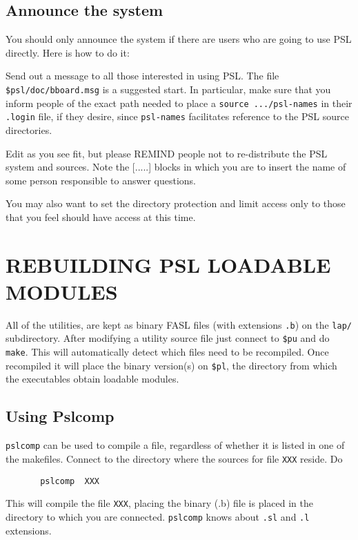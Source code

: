 \subsection{Announce the system}

You should only announce the system if there are users who are going
to use PSL directly. Here is how to do it:

Send out a message to all those interested in using PSL.  The file
{\tt \$psl/doc/bboard.msg} is a suggested start.  In particular, make
sure that you inform people of the exact path needed to place a
{\tt source .../psl-names} in their {\tt .login} file, if they desire, since
{\tt psl-names} facilitates reference to the PSL source directories.

Edit as you see fit, but please REMIND people not to re-distribute the PSL
system and sources. Note the [.....] blocks in which you are to insert
the name of some person responsible to answer questions.

You may also want to set the directory protection and limit access only to
those that you feel should have access at this time.

\section{REBUILDING PSL LOADABLE MODULES}

All of the utilities, are kept as binary FASL files (with extensions
{\tt .b}) on the {\tt lap/} subdirectory.  After modifying a utility source
file just connect to {\tt \$pu} and do {\tt make}.  This will
automatically detect which files need to be recompiled.  Once
recompiled it will place the binary version(s) on {\tt \$pl}, the
directory from which the executables obtain loadable modules.

\subsection{Using Pslcomp}

{\tt pslcomp} can be used to compile a file, regardless of whether it is
listed in one of the makefiles.  Connect to the directory where the
sources for file {\tt XXX} reside.  Do
\begin{verbatim}
       pslcomp  XXX
\end{verbatim}
This will compile the file {\tt XXX}, placing the binary (.b) file is
placed in the directory to which you are connected.  {\tt pslcomp}
knows about {\tt .sl} and {\tt .l} extensions.

